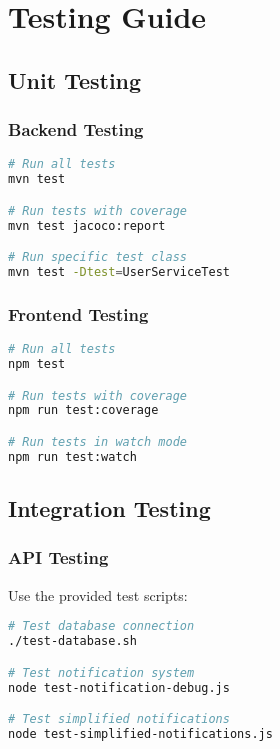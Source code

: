 \documentclass[12pt,a4paper]{article}
\begin{document}
\section{Testing Guide}

\subsection{Unit Testing}

\subsubsection{Backend Testing}

\begin{lstlisting}[language=bash, caption=Backend Tests]
# Run all tests
mvn test

# Run tests with coverage
mvn test jacoco:report

# Run specific test class
mvn test -Dtest=UserServiceTest
\end{lstlisting}

\subsubsection{Frontend Testing}

\begin{lstlisting}[language=bash, caption=Frontend Tests]
# Run all tests
npm test

# Run tests with coverage
npm run test:coverage

# Run tests in watch mode
npm run test:watch
\end{lstlisting}

\subsection{Integration Testing}

\subsubsection{API Testing}

Use the provided test scripts:

\begin{lstlisting}[language=bash, caption=API Testing]
# Test database connection
./test-database.sh

# Test notification system
node test-notification-debug.js

# Test simplified notifications
node test-simplified-notifications.js
\end{lstlisting}
\end{document}
